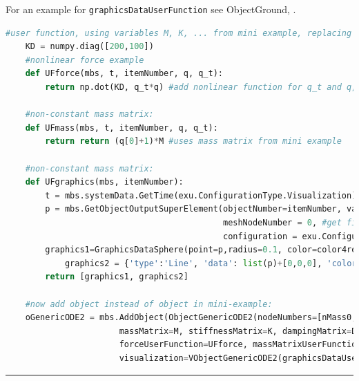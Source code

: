     For an example for \texttt{graphicsDataUserFunction} see ObjectGround, .
    \finishTable
    \userFunctionExample{}
    \pythonstyle
    \begin{lstlisting}[language=Python]
    #user function, using variables M, K, ... from mini example, replacing ObjectGenericODE2(...)
    KD = numpy.diag([200,100])
    #nonlinear force example
    def UFforce(mbs, t, itemNumber, q, q_t): 
        return np.dot(KD, q_t*q) #add nonlinear function for q_t and q, q_t*q gives vector
    
    #non-constant mass matrix:
    def UFmass(mbs, t, itemNumber, q, q_t): 
        return return (q[0]+1)*M #uses mass matrix from mini example
    
    #non-constant mass matrix:
    def UFgraphics(mbs, itemNumber):
        t = mbs.systemData.GetTime(exu.ConfigurationType.Visualization) #get time if needed
        p = mbs.GetObjectOutputSuperElement(objectNumber=itemNumber, variableType = exu.OutputVariableType.Position,
                                            meshNodeNumber = 0, #get first node's position 
                                            configuration = exu.ConfigurationType.Visualization)
        graphics1=GraphicsDataSphere(point=p,radius=0.1, color=color4red)
            graphics2 = {'type':'Line', 'data': list(p)+[0,0,0], 'color':color4blue}
        return [graphics1, graphics2] 

    #now add object instead of object in mini-example:
    oGenericODE2 = mbs.AddObject(ObjectGenericODE2(nodeNumbers=[nMass0,nMass1], 
                       massMatrix=M, stiffnessMatrix=K, dampingMatrix=D,
                       forceUserFunction=UFforce, massMatrixUserFunction=UFmass,
                       visualization=VObjectGenericODE2(graphicsDataUserFunction=UFgraphics)))
    \end{lstlisting}
\vspace{6pt}\par\noindent\rule{\textwidth}{0.4pt}
